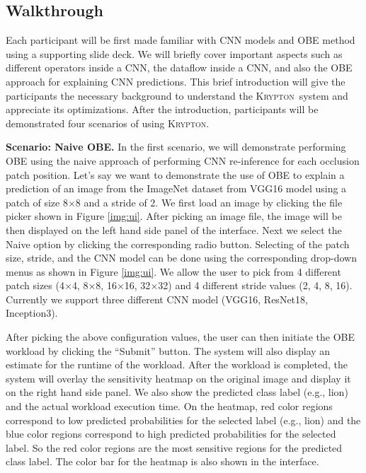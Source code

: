 \documentclass{vldb}
\newcommand{\system}{\textsc{Krypton}}
\begin{document}
\subsection{Walkthrough}
Each participant will be first made familiar with CNN models and OBE method using a supporting slide deck.
We will briefly cover important aspects such as different operators inside a CNN, the dataflow inside a CNN, and also the OBE approach for explaining CNN predictions.
This brief introduction will give the participants the necessary background to understand the \system~system and appreciate its optimizations.
After the introduction, participants will be demonstrated four scenarios of using \system.

\vspace{2mm}
\noindent \textbf{Scenario: Naive OBE.} In the first scenario, we will demonstrate performing OBE using the naive approach of performing CNN re-inference for each occlusion patch position.
Let's say we want to demonstrate the use of OBE to explain a prediction of an image from the ImageNet dataset from VGG16 model using a patch of size 8$\times$8 and a stride of 2.
We first load an image by clicking the file picker shown in Figure \ref{img:ui}.
After picking an image file, the image will be then displayed on the left hand side panel of the interface.
Next we select the Naive option by clicking the corresponding radio button.
Selecting of the patch size, stride, and the CNN model can be done using the corresponding drop-down menus as shown in Figure \ref{img:ui}.
We allow the user to pick from 4 different patch sizes (4$\times$4, 8$\times$8, 16$\times$16, 32$\times$32) and 4 different stride values (2, 4, 8, 16).
Currently we support three different CNN model (VGG16, ResNet18, Inception3).

After picking the above configuration values, the user can then initiate the OBE workload by clicking the ``Submit'' button.
The system will also display an estimate for the runtime of the workload.
After the workload is completed, the system will overlay the sensitivity heatmap on the original image and display it on the right hand side panel.
We also show the predicted class label (e.g., lion) and the actual workload execution time.
On the heatmap, red color regions correspond to low predicted probabilities for the selected label (e.g., lion) and the blue color regions correspond to high predicted probabilities for the selected label. So the red color regions are the most sensitive regions for the predicted class label.
The color bar for the heatmap is also shown in the interface.
\end{document}
